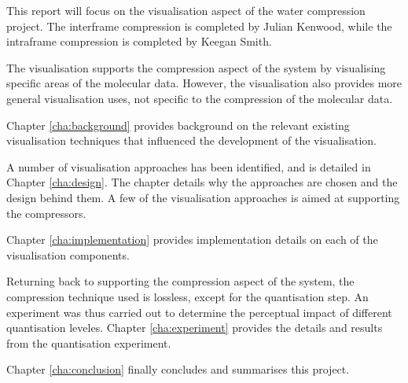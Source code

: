 This report will focus on the visualisation aspect of the water compression
project. The interframe compression is completed by Julian Kenwood, while the
intraframe compression is completed by Keegan Smith.

The visualisation supports the compression aspect of the system by visualising
specific areas of the molecular data.  However, the visualisation also provides
more general visualisation uses, not specific to the compression of the
molecular data.

Chapter \ref{cha:background} provides background on the relevant existing
visualisation techniques that influenced the development of the visualisation.

A number of visualisation approaches has been identified, and is detailed in
Chapter \ref{cha:design}. The chapter details why the approaches are chosen and
the design behind them. A few of the visualisation approaches is aimed at
supporting the compressors.

Chapter \ref{cha:implementation} provides implementation details on each of the
visualisation components.

Returning back to supporting the compression aspect of the system, the
compression technique used is lossless, except for the quantisation step. An
experiment was thus carried out to determine the perceptual impact of different
quantisation leveles. Chapter \ref{cha:experiment} provides the details and
results from the quantisation experiment.

Chapter \ref{cha:conclusion} finally concludes and summarises this project.


